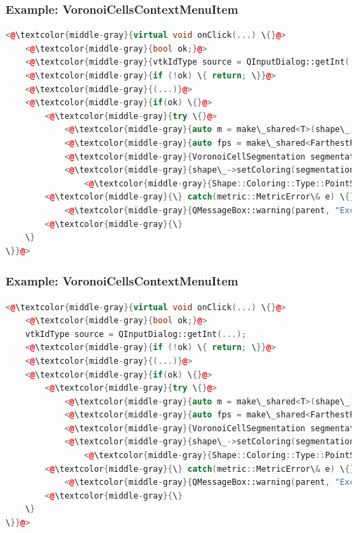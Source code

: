 \documentclass[compress]{beamer}
\begin{document}
\begin{frame}[fragile]
  \frametitle{Example: VoronoiCellsContextMenuItem}
  
\begin{lstlisting}[language=C++, numbers=none]
<@\textcolor{middle-gray}{virtual void onClick(...) \{}@>
    <@\textcolor{middle-gray}{bool ok;}@>
    <@\textcolor{middle-gray}{vtkIdType source = QInputDialog::getInt(...);}@>
    <@\textcolor{middle-gray}{if (!ok) \{ return; \}}@>
    <@\textcolor{middle-gray}{(...)}@>
    <@\textcolor{middle-gray}{if(ok) \{}@>
        <@\textcolor{middle-gray}{try \{}@>
            <@\textcolor{middle-gray}{auto m = make\_shared<T>(shape\_);}@>
            <@\textcolor{middle-gray}{auto fps = make\_shared<FarthestPointSampling>(shape\_, m, source, numberOfSegments);}@>
            <@\textcolor{middle-gray}{VoronoiCellSegmentation segmentation(shape\_, m, fps);}@>
            <@\textcolor{middle-gray}{shape\_->setColoring(segmentation.getSegments(), }@>
            	<@\textcolor{middle-gray}{Shape::Coloring::Type::PointSegmentation);}@>
        <@\textcolor{middle-gray}{\} catch(metric::MetricError\& e) \{}@>
            <@\textcolor{middle-gray}{QMessageBox::warning(parent, "Exception", e.what());}@>
        <@\textcolor{middle-gray}{\}
    \}
\}}@>
\end{lstlisting}
  
\end{frame}

\begin{frame}[fragile]
  \frametitle{Example: VoronoiCellsContextMenuItem}
  
\begin{lstlisting}[language=C++, numbers=none]
<@\textcolor{middle-gray}{virtual void onClick(...) \{}@>
    <@\textcolor{middle-gray}{bool ok;}@>
    vtkIdType source = QInputDialog::getInt(...);
    <@\textcolor{middle-gray}{if (!ok) \{ return; \}}@>
    <@\textcolor{middle-gray}{(...)}@>
    <@\textcolor{middle-gray}{if(ok) \{}@>
        <@\textcolor{middle-gray}{try \{}@>
            <@\textcolor{middle-gray}{auto m = make\_shared<T>(shape\_);}@>
            <@\textcolor{middle-gray}{auto fps = make\_shared<FarthestPointSampling>(shape\_, m, source, numberOfSegments);}@>
            <@\textcolor{middle-gray}{VoronoiCellSegmentation segmentation(shape\_, m, fps);}@>
            <@\textcolor{middle-gray}{shape\_->setColoring(segmentation.getSegments(), }@>
            	<@\textcolor{middle-gray}{Shape::Coloring::Type::PointSegmentation);}@>
        <@\textcolor{middle-gray}{\} catch(metric::MetricError\& e) \{}@>
            <@\textcolor{middle-gray}{QMessageBox::warning(parent, "Exception", e.what());}@>
        <@\textcolor{middle-gray}{\}
    \}
\}}@>
\end{lstlisting}
  
\end{frame}
\end{document}
